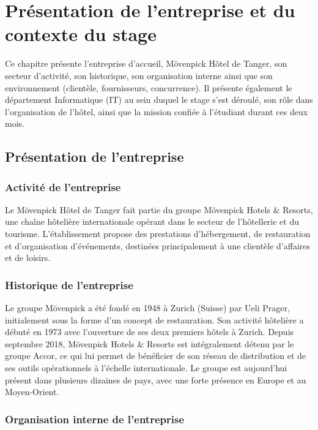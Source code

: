 \chapter{Présentation de l'entreprise et du contexte du stage}

Ce chapitre présente l'entreprise d'accueil, Mövenpick Hôtel de Tanger, son secteur
d'activité, son historique, son organisation interne ainsi que son environnement
(clientèle, fournisseurs, concurrence). Il présente également le département
Informatique (IT) au sein duquel le stage s'est déroulé, son rôle dans l'organisation de
l'hôtel, ainsi que la mission confiée à l'étudiant durant ces deux mois.

\section{Présentation de l'entreprise}

\subsection{Activité de l'entreprise}

Le Mövenpick Hôtel de Tanger fait partie du groupe Mövenpick Hotels \& Resorts, une
chaîne hôtelière internationale opérant dans le secteur de l'hôtellerie et du tourisme.
L'établissement propose des prestations d'hébergement, de restauration et
d'organisation d'événements, destinées principalement à une clientèle d'affaires et de
loisirs.

\subsection{Historique de l'entreprise}

Le groupe Mövenpick a été fondé en 1948 à Zurich (Suisse) par Ueli Prager, initialement
sous la forme d'un concept de restauration. Son activité hôtelière a débuté en 1973 avec
l'ouverture de ses deux premiers hôtels à Zurich. Depuis septembre 2018, Mövenpick
Hotels \& Resorts est intégralement détenu par le groupe Accor, ce qui lui permet de
bénéficier de son réseau de distribution et de ses outils opérationnels à l'échelle
internationale. Le groupe est aujourd'hui présent dans plusieurs dizaines de pays, avec
une forte présence en Europe et au Moyen-Orient.

\subsection{Organisation interne de l'entreprise}

